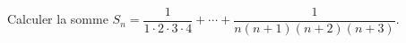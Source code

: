 Calculer la somme $S_n = \dfrac{1}{1\cdot 2\cdot 3\cdot 4} + \cdots + \dfrac{1}{n(n+1)(n+2)(n+3)}$.
